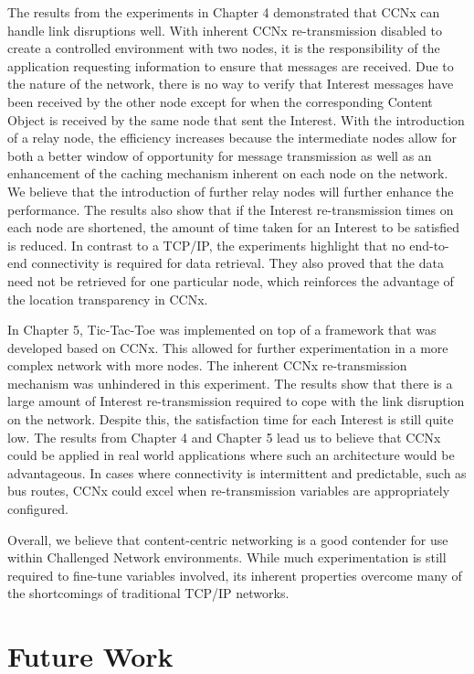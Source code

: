 \documentclass[a4paper,12pt]{report}      %
\begin{document}
The results from the experiments in Chapter 4 demonstrated that CCNx can handle link disruptions well. With inherent CCNx re-transmission
disabled to create a controlled environment with two nodes, it is the responsibility of the application requesting information to ensure that messages are received. Due to the nature of the network, there is no way to verify that Interest messages have been received by the other node except for when the corresponding Content Object is received by the same node that sent the Interest. With the introduction of a relay node, the efficiency increases because the intermediate nodes allow for both a better window of opportunity for message transmission as well as an enhancement of the caching mechanism inherent on each node on the network. We believe that the introduction of further relay nodes will further enhance the performance. The results also show that if the Interest re-transmission times on each node are shortened, the amount of time taken for an Interest to be satisfied is reduced. In contrast to a TCP/IP, the experiments highlight that no end-to-end connectivity is required for data retrieval. They also proved that the data need not be retrieved for one particular node, which reinforces the advantage of the location transparency in CCNx.

In Chapter 5, Tic-Tac-Toe was implemented on top of a framework that was developed based on CCNx. This allowed for further experimentation in a more complex network with more nodes. The inherent CCNx re-transmission mechanism was unhindered in this experiment. The results show that there is a large amount of Interest re-transmission required to cope with the link disruption on the network. Despite this, the satisfaction time for each Interest is still quite low. The results from Chapter 4 and Chapter 5 lead us to believe that CCNx could be applied in real world applications where such an architecture would be advantageous. In cases where connectivity is intermittent and predictable, such as bus routes, CCNx could excel when re-transmission variables are appropriately configured.

Overall, we believe that content-centric networking is a good contender for use within Challenged Network environments. While much experimentation is still required to fine-tune variables involved, its inherent properties overcome many of the shortcomings of traditional TCP/IP networks. 

\pagebreak
\chapter{Future Work}
\end{document}
